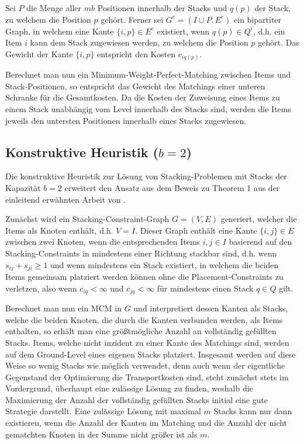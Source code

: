 Sei $P$ die Menge aller $mb$ Positionen innerhalb der Stacks und $q(p)$ der Stack, zu welchem die Position $p$ gehört.
Ferner sei $G^c = (I \cup P, E^c)$ ein bipartiter Graph, in welchem eine Kante $\{i, p\} \in E^c$ existiert,
wenn $q(p) \in Q^i$, d.h. ein Item $i$ kann dem Stack zugewiesen werden, zu welchem die Position $p$ gehört.
Das Gewicht der Kante $\{i, p\}$ entspricht den Kosten $c_{iq(p)}$.

Berechnet man nun ein Minimum-Weight-Perfect-Matching zwischen Items und Stack-Positionen, so entspricht
das Gewicht des Matchings einer unteren Schranke für die Gesamtkosten. Da die Kosten der Zuweisung eines Items
zu einem Stack unabhängig vom Level innerhalb des Stacks sind, werden die Items jeweils den untersten Positionen
innerhalb eines Stacks zugewiesen.

\vfill

\pagebreak

\subsection{Konstruktive Heuristik ($b = 2$)}
\label{sec:two_cap_heuristic}

Die konstruktive Heuristik zur Lösung von Stacking-Problemen mit Stacks der Kapazität $b=2$ erweitert den Ansatz aus dem Beweis
zu Theorem 1 aus der einleitend erwähnten Arbeit von \citet{Bruns2015}.

Zunächst wird ein Stacking-Constraint-Graph $G = (V, E)$ generiert, welcher die Items als Knoten enthält, d.h. $V = I$. Dieser Graph
enthält eine Kante $\{i, j\} \in E$ zwischen zwei Knoten, wenn die entsprechenden Items $i, j \in I$ basierend auf den Stacking-Constraints
in mindestens einer Richtung stackbar sind, d.h. wenn $s_{ij} + s_{ji} \geq 1$ und wenn mindestens ein Stack existiert, in welchem die beiden Items gemeinsam platziert werden können ohne die Placement-Constraints zu verletzen, also wenn $c_{iq} < \infty$ und $c_{jq} < \infty$ für
mindestens einen Stack $q \in Q$ gilt.

Berechnet man nun ein \textsc{MCM} in $G$ und interpretiert dessen Kanten als Stacks, welche die beiden Knoten, die durch
die Kanten verbunden werden, als Items enthalten, so erhält man eine größtmögliche Anzahl an vollständig gefüllten Stacks.
Items, welche nicht inzident zu einer Kante des Matchings sind, werden auf dem Ground-Level eines eigenen Stacks platziert.
Insgesamt werden auf diese Weise so wenig Stacks wie möglich verwendet, denn auch wenn der eigentliche Gegenstand der Optimierung die Transportkosten sind, steht zunächst stets im Vordergrund, überhaupt eine zulässige Lösung zu finden, weshalb die Maximierung der Anzahl der vollständig gefüllten Stacks initial eine gute Strategie darstellt.
Eine zulässige Lösung mit maximal $m$ Stacks kann nur dann existieren, wenn die Anzahl der Kanten im Matching und die Anzahl der nicht gematchten Knoten in der Summe nicht größer ist als $m$.

